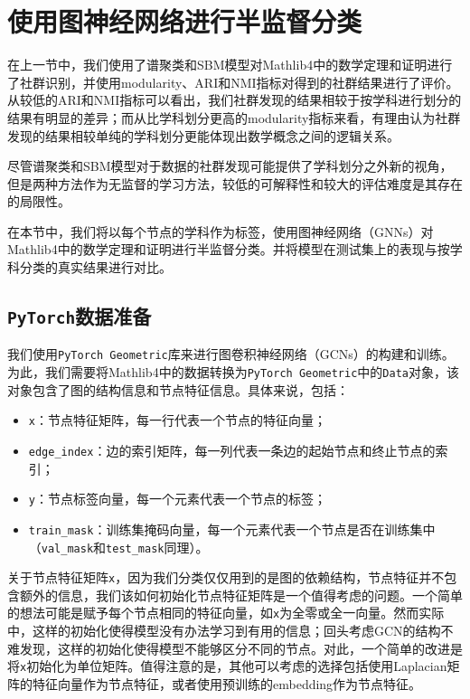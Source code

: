 \graphicspath{{../graph_nn/fig/}}
\section{使用图神经网络进行半监督分类}
在上一节中，我们使用了谱聚类和SBM模型对Mathlib4中的数学定理和证明进行了社群识别，并使用modularity、ARI和NMI指标对得到的社群结果进行了评价。从较低的ARI和NMI指标可以看出，我们社群发现的结果相较于按学科进行划分的结果有明显的差异；而从比学科划分更高的modularity指标来看，有理由认为社群发现的结果相较单纯的学科划分更能体现出数学概念之间的逻辑关系。

尽管谱聚类和SBM模型对于数据的社群发现可能提供了学科划分之外新的视角，但是两种方法作为无监督的学习方法，较低的可解释性和较大的评估难度是其存在的局限性。

在本节中，我们将以每个节点的学科作为标签，使用图神经网络（GNNs）对Mathlib4中的数学定理和证明进行半监督分类。并将模型在测试集上的表现与按学科分类的真实结果进行对比。

\subsection{\texttt{PyTorch}数据准备}
我们使用\texttt{PyTorch Geometric}库来进行图卷积神经网络（GCNs）的构建和训练。为此，我们需要将Mathlib4中的数据转换为\texttt{PyTorch Geometric}中的\texttt{Data}对象，该对象包含了图的结构信息和节点特征信息。具体来说，包括：
\begin{itemize}
    \item \texttt{x}：节点特征矩阵，每一行代表一个节点的特征向量；
    \item \texttt{edge\_index}：边的索引矩阵，每一列代表一条边的起始节点和终止节点的索引；
    \item \texttt{y}：节点标签向量，每一个元素代表一个节点的标签；
    \item \texttt{train\_mask}：训练集掩码向量，每一个元素代表一个节点是否在训练集中（\texttt{val\_mask}和\texttt{test\_mask}同理）。
\end{itemize}

关于节点特征矩阵\texttt{x}，因为我们分类仅仅用到的是图的依赖结构，节点特征并不包含额外的信息，我们该如何初始化节点特征矩阵是一个值得考虑的问题。一个简单的想法可能是赋予每个节点相同的特征向量，如\texttt{x}为全零或全一向量。然而实际中，这样的初始化使得模型没有办法学习到有用的信息；回头考虑GCN的结构不难发现，这样的初始化使得模型不能够区分不同的节点。对此，一个简单的改进是将\texttt{x}初始化为单位矩阵。值得注意的是，其他可以考虑的选择包括使用Laplacian矩阵的特征向量作为节点特征，或者使用预训练的embedding作为节点特征。

